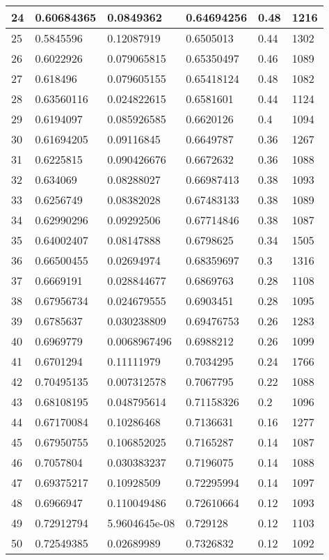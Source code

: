 \begin{longtable}{|l|l|l|l|l|l|}
24 & 0.60684365 & 0.0849362 & 0.64694256 & 0.48 & 1216 \\ \hline 
25 & 0.5845596 & 0.12087919 & 0.6505013 & 0.44 & 1302 \\ \hline 
26 & 0.6022926 & 0.079065815 & 0.65350497 & 0.46 & 1089 \\ \hline 
27 & 0.618496 & 0.079605155 & 0.65418124 & 0.48 & 1082 \\ \hline 
28 & 0.63560116 & 0.024822615 & 0.6581601 & 0.44 & 1124 \\ \hline 
29 & 0.6194097 & 0.085926585 & 0.6620126 & 0.4 & 1094 \\ \hline 
30 & 0.61694205 & 0.09116845 & 0.6649787 & 0.36 & 1267 \\ \hline 
31 & 0.6225815 & 0.090426676 & 0.6672632 & 0.36 & 1088 \\ \hline 
32 & 0.634069 & 0.08288027 & 0.66987413 & 0.38 & 1093 \\ \hline 
33 & 0.6256749 & 0.08382028 & 0.67483133 & 0.38 & 1089 \\ \hline 
34 & 0.62990296 & 0.09292506 & 0.67714846 & 0.38 & 1087 \\ \hline 
35 & 0.64002407 & 0.08147888 & 0.6798625 & 0.34 & 1505 \\ \hline 
36 & 0.66500455 & 0.02694974 & 0.68359697 & 0.3 & 1316 \\ \hline 
37 & 0.6669191 & 0.028844677 & 0.6869763 & 0.28 & 1108 \\ \hline 
38 & 0.67956734 & 0.024679555 & 0.6903451 & 0.28 & 1095 \\ \hline 
39 & 0.6785637 & 0.030238809 & 0.69476753 & 0.26 & 1283 \\ \hline 
40 & 0.6969779 & 0.0068967496 & 0.6988212 & 0.26 & 1099 \\ \hline 
41 & 0.6701294 & 0.11111979 & 0.7034295 & 0.24 & 1766 \\ \hline 
42 & 0.70495135 & 0.007312578 & 0.7067795 & 0.22 & 1088 \\ \hline 
43 & 0.68108195 & 0.048795614 & 0.71158326 & 0.2 & 1096 \\ \hline 
44 & 0.67170084 & 0.10286468 & 0.7136631 & 0.16 & 1277 \\ \hline 
45 & 0.67950755 & 0.106852025 & 0.7165287 & 0.14 & 1087 \\ \hline 
46 & 0.7057804 & 0.030383237 & 0.7196075 & 0.14 & 1088 \\ \hline 
47 & 0.69375217 & 0.10928509 & 0.72295994 & 0.14 & 1097 \\ \hline 
48 & 0.6966947 & 0.110049486 & 0.72610664 & 0.12 & 1093 \\ \hline 
49 & 0.72912794 & 5.9604645e-08 & 0.729128 & 0.12 & 1103 \\ \hline 
50 & 0.72549385 & 0.02689989 & 0.7326832 & 0.12 & 1092 \\ \hline 
\end{longtable}